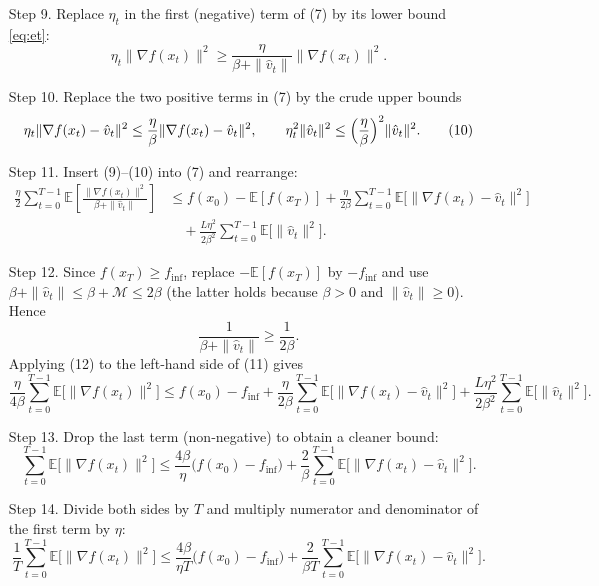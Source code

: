 \documentclass{article}
\begin{document}
\begin{enumerate}
\item[Step 9.] Replace $\eta_t$ in the first (negative) term of (7) by its lower bound \eqref{eq:et}:
\[
    \eta_t\|\nabla f(x_t)\|^2
    \ge \frac{\eta}{\beta+\|\hat v_t\|}\|\nabla f(x_t)\|^2 .
\tag{9}
\]
\item[Step 10.] Replace the two positive terms in (7) by the crude upper bounds
\[
    \eta_t\|\nabla f(x_t)-\hat v_t\|^2
    \le \frac{\eta}{\beta}\|\nabla f(x_t)-\hat v_t\|^2,
    \qquad
    \eta_t^2\|\hat v_t\|^2\le\Bigl(\frac{\eta}{\beta}\Bigr)^2\|\hat v_t\|^2 .
\tag{10}
\]
\item[Step 11.] Insert (9)–(10) into (7) and rearrange:
\[
\begin{aligned}
    \frac{\eta}{2}\sum_{t=0}^{T-1}
        \mathbb{E}\!\left[\frac{\|\nabla f(x_t)\|^2}{\beta+\|\hat v_t\|}\right]
    &\le f(x_0)-\mathbb{E}[f(x_T)]
        +\frac{\eta}{2\beta}\sum_{t=0}^{T-1}
        \mathbb{E}\!\bigl[\|\nabla f(x_t)-\hat v_t\|^2\bigr] \\
    &\quad +\frac{L\eta^2}{2\beta^2}\sum_{t=0}^{T-1}
        \mathbb{E}\!\bigl[\|\hat v_t\|^2\bigr].
\end{aligned}
\tag{11}
\]
\item[Step 12.] Since $f(x_T)\ge f_{\inf}$, replace $-\mathbb{E}[f(x_T)]$ by $-f_{\inf}$ and use $\beta+\|\hat v_t\|\le\beta+\mathcal{M}\le 2\beta$ (the latter holds because $\beta>0$ and $\|\hat v_t\|\ge0$). Hence
\[
    \frac{1}{\beta+\|\hat v_t\|}
    \ge \frac{1}{2\beta}.
\tag{12}
\]
Applying (12) to the left‑hand side of (11) gives
\[
    \frac{\eta}{4\beta}\sum_{t=0}^{T-1}
        \mathbb{E}\!\bigl[\|\nabla f(x_t)\|^2\bigr]
    \le f(x_0)-f_{\inf}
        +\frac{\eta}{2\beta}\sum_{t=0}^{T-1}
        \mathbb{E}\!\bigl[\|\nabla f(x_t)-\hat v_t\|^2\bigr]
        +\frac{L\eta^2}{2\beta^2}\sum_{t=0}^{T-1}
        \mathbb{E}\!\bigl[\|\hat v_t\|^2\bigr].
\tag{13}
\]
\item[Step 13.] Drop the last term (non‑negative) to obtain a cleaner bound:
\[
    \sum_{t=0}^{T-1}\mathbb{E}\!\bigl[\|\nabla f(x_t)\|^2\bigr]
    \le
    \frac{4\beta}{\eta}\bigl(f(x_0)-f_{\inf}\bigr)
    +\frac{2}{\beta}\sum_{t=0}^{T-1}
        \mathbb{E}\!\bigl[\|\nabla f(x_t)-\hat v_t\|^2\bigr].
\tag{14}
\]
\item[Step 14.] Divide both sides by $T$ and multiply numerator and denominator of the first term by $\eta$:
\[
    \frac{1}{T}\sum_{t=0}^{T-1}\mathbb{E}\!\bigl[\|\nabla f(x_t)\|^2\bigr]
    \le
    \frac{4\beta}{\eta T}\bigl(f(x_0)-f_{\inf}\bigr)
    +\frac{2}{\beta T}\sum_{t=0}^{T-1}
        \mathbb{E}\!\bigl[\|\nabla f(x_t)-\hat v_t\|^2\bigr].
\]
\end{enumerate}
\end{document}

